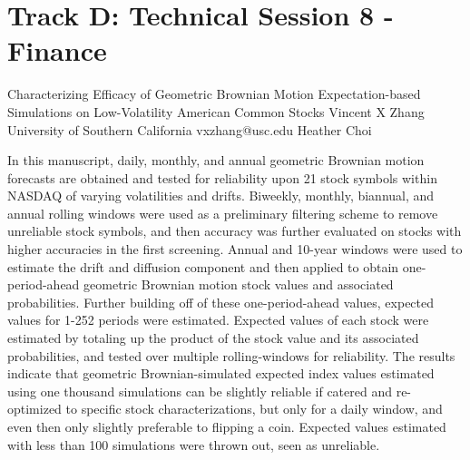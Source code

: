 \section{Track D: Technical Session 8 - Finance}\newpage

\begin{talk}
  {Characterizing Efficacy of Geometric Brownian Motion Expectation-based Simulations on Low-Volatility American Common Stocks}%
  {Vincent X Zhang}%
  {University of Southern California}%
  {vxzhang@usc.edu}%
  {Heather Choi}%
  
    
   
In this manuscript, daily, monthly, and annual geometric Brownian motion forecasts are obtained and tested for reliability upon 21 stock symbols within NASDAQ of varying volatilities and drifts. Biweekly, monthly, biannual, and annual rolling windows were used as a preliminary filtering scheme to remove unreliable stock symbols, and then accuracy was further evaluated on stocks with higher accuracies in the first screening. Annual and 10-year windows were used to estimate the drift and diffusion component and then applied to obtain one-period-ahead geometric Brownian motion stock values and associated probabilities. Further building off of these one-period-ahead values, expected values for 1-252 periods were estimated. Expected values of each stock were estimated by totaling up the product of the stock value and its associated probabilities, and tested over multiple rolling-windows for reliability. The results indicate that geometric Brownian-simulated expected index values estimated using one thousand simulations can be slightly reliable if catered and re-optimized to specific stock characterizations, but only for a daily window, and even then only slightly preferable to flipping a coin. Expected values estimated with less than 100 simulations were thrown out, seen as unreliable.


\medskip


\end{talk}
